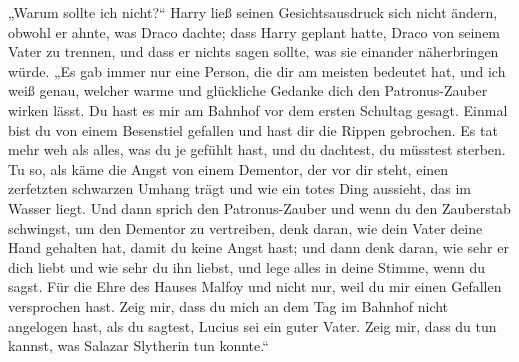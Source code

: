 „Warum sollte ich nicht?“ Harry ließ seinen Gesichtsausdruck sich nicht ändern, obwohl er ahnte, was Draco dachte; dass Harry geplant hatte, Draco von seinem Vater zu trennen, und dass er nichts sagen sollte, was sie einander näherbringen würde. „Es gab immer nur eine Person, die dir am meisten bedeutet hat, und ich weiß genau, welcher warme und glückliche Gedanke dich den Patronus-Zauber wirken lässt. Du hast es mir am Bahnhof vor dem ersten Schultag gesagt. Einmal bist du von einem Besenstiel gefallen und hast dir die Rippen gebrochen. Es tat mehr weh als alles, was du je gefühlt hast, und du dachtest, du müsstest sterben. Tu so, als käme die Angst von einem Dementor, der vor dir steht, einen zerfetzten schwarzen Umhang trägt und wie ein totes Ding aussieht, das im Wasser liegt. Und dann sprich den Patronus-Zauber und wenn du den Zauberstab schwingst, um den Dementor zu vertreiben, denk daran, wie dein Vater deine Hand gehalten hat, damit du keine Angst hast; und dann denk daran, wie sehr er dich liebt und wie sehr du ihn liebst, und lege alles in deine Stimme, wenn du  sagst. Für die Ehre des Hauses Malfoy und nicht nur, weil du mir einen Gefallen versprochen hast. Zeig mir, dass du mich an dem Tag im Bahnhof nicht angelogen hast, als du sagtest, Lucius sei ein guter Vater. Zeig mir, dass du tun kannst, was Salazar Slytherin tun konnte.“

